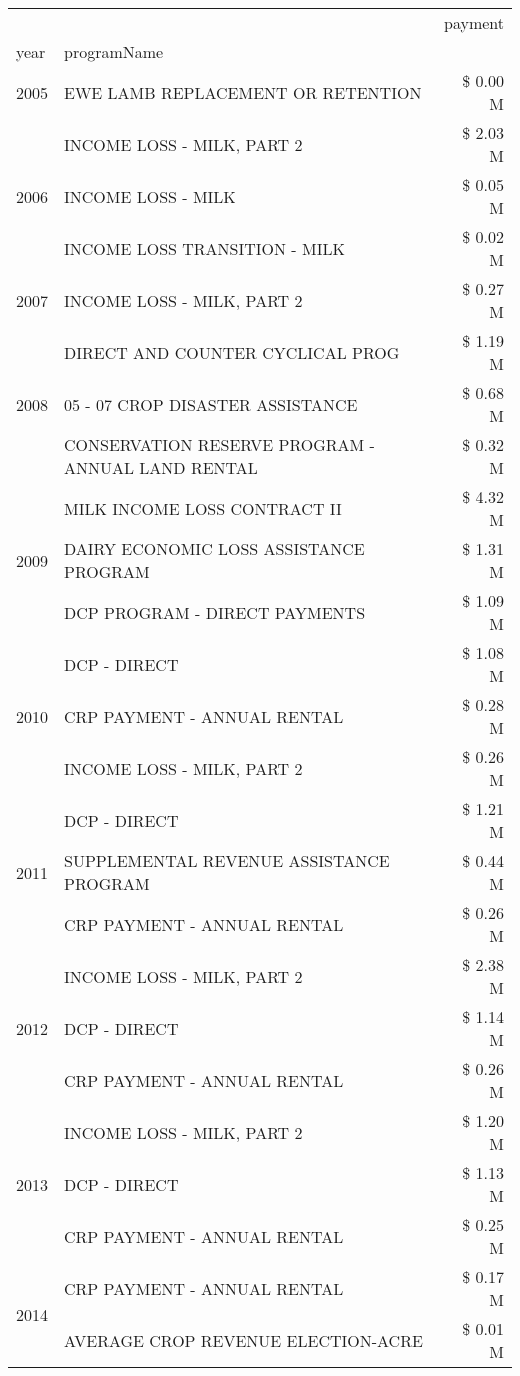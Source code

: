 \begin{tabular}{llr}
\toprule
 &  & payment \\
year & programName &  \\
\midrule
2005 & EWE LAMB REPLACEMENT OR RETENTION & \$ 0.00 M \\
\cline{1-3}
\multirow[t]{3}{*}{2006} & INCOME LOSS - MILK, PART 2 & \$ 2.03 M \\
 & INCOME LOSS - MILK & \$ 0.05 M \\
 & INCOME LOSS TRANSITION - MILK & \$ 0.02 M \\
\cline{1-3}
2007 & INCOME LOSS - MILK, PART 2 & \$ 0.27 M \\
\cline{1-3}
\multirow[t]{3}{*}{2008} & DIRECT AND COUNTER CYCLICAL PROG & \$ 1.19 M \\
 & 05 - 07 CROP DISASTER ASSISTANCE & \$ 0.68 M \\
 & CONSERVATION RESERVE PROGRAM - ANNUAL LAND RENTAL & \$ 0.32 M \\
\cline{1-3}
\multirow[t]{3}{*}{2009} & MILK INCOME LOSS CONTRACT II & \$ 4.32 M \\
 & DAIRY ECONOMIC LOSS ASSISTANCE PROGRAM & \$ 1.31 M \\
 & DCP PROGRAM - DIRECT PAYMENTS & \$ 1.09 M \\
\cline{1-3}
\multirow[t]{3}{*}{2010} & DCP - DIRECT & \$ 1.08 M \\
 & CRP PAYMENT - ANNUAL RENTAL & \$ 0.28 M \\
 & INCOME LOSS - MILK, PART 2 & \$ 0.26 M \\
\cline{1-3}
\multirow[t]{3}{*}{2011} & DCP - DIRECT & \$ 1.21 M \\
 & SUPPLEMENTAL REVENUE ASSISTANCE PROGRAM & \$ 0.44 M \\
 & CRP PAYMENT - ANNUAL RENTAL & \$ 0.26 M \\
\cline{1-3}
\multirow[t]{3}{*}{2012} & INCOME LOSS - MILK, PART 2 & \$ 2.38 M \\
 & DCP - DIRECT & \$ 1.14 M \\
 & CRP PAYMENT - ANNUAL RENTAL & \$ 0.26 M \\
\cline{1-3}
\multirow[t]{3}{*}{2013} & INCOME LOSS - MILK, PART 2 & \$ 1.20 M \\
 & DCP - DIRECT & \$ 1.13 M \\
 & CRP PAYMENT - ANNUAL RENTAL & \$ 0.25 M \\
\cline{1-3}
\multirow[t]{2}{*}{2014} & CRP PAYMENT - ANNUAL RENTAL & \$ 0.17 M \\
 & AVERAGE CROP REVENUE ELECTION-ACRE & \$ 0.01 M \\

\end{tabular}
